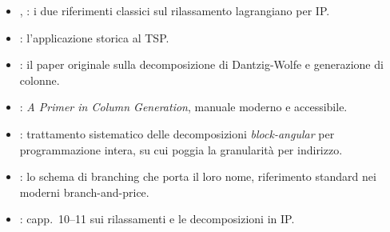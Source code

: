 \begin{biblioparvabox}
\begin{itemize}
\item \cite{geoffrion1974}, \cite{fisher1981}: i due
  riferimenti classici sul rilassamento lagrangiano per IP.
\item \cite{heldkarp1971}: l'applicazione storica al TSP.
\item \cite{dantzig1960}: il paper originale sulla
  decomposizione di Dantzig-Wolfe e generazione di
  colonne.
\item \cite{desrosiers2005}: \emph{A Primer in Column
  Generation}, manuale moderno e accessibile.
\item \cite{vanderbeck2010}: trattamento sistematico delle
  decomposizioni \emph{block-angular} per programmazione
  intera, su cui poggia la granularit\`a per indirizzo.
\item \cite{ryanfoster1981}: lo schema di branching che
  porta il loro nome, riferimento standard nei moderni
  branch-and-price.
\item \cite{wolsey1998}: capp.~10--11 sui rilassamenti
  e le decomposizioni in IP.
\end{itemize}
\end{biblioparvabox}
